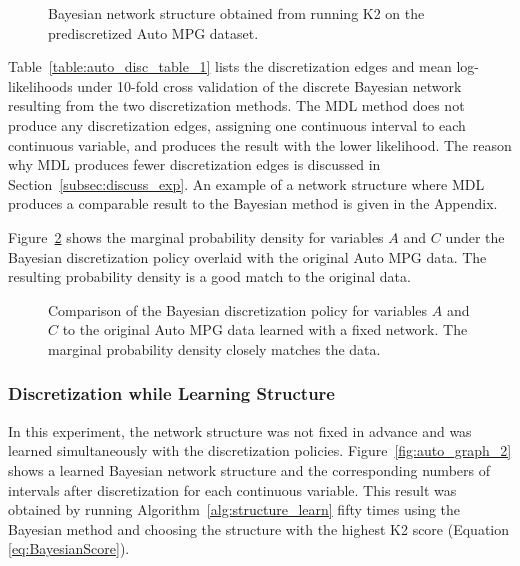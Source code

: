 \begin{figure}[ht]
  \centering
   
   \caption{Bayesian network structure obtained from running K2 on the prediscretized Auto MPG dataset.}
  \label{fig:auto_graph_1}
\end{figure}

Table~\ref{table:auto_disc_table_1} lists the discretization edges and mean log-likelihoods under \num{10}-fold cross validation of the discrete Bayesian network resulting from the two discretization methods.
The MDL method does not produce any discretization edges, assigning one continuous interval to each continuous variable, and produces the result with the lower likelihood.
The reason why MDL produces fewer discretization edges is discussed in Section~\ref{subsec:discuss_exp}.
An example of a network structure where MDL produces a comparable result to the Bayesian method is given in the Appendix.

\begin{table}[ht]
  \centering
  \caption{
    Discretization result of the Auto MPG dataset with fixed structure from Figure~\ref{fig:auto_graph_1}.
    The first five rows list the discretization edges and the last row lists the mean cross-validated log-likelihood; positive values are better.
  }
  
  \label{table:auto_disc_table_1}
\end{table}

Figure~\ref{fig:auto_exp1_distr_1_3} shows the marginal probability density for variables $A$ and $C$ under the Bayesian discretization policy overlaid with the original Auto MPG data.
The resulting probability density is a good match to the original data.

\begin{figure}[ht]
  \centering
  
  \caption{
    Comparison of the Bayesian discretization policy for variables $A$ and $C$ to the original Auto MPG data learned with a fixed network.
    The marginal probability density closely matches the data.
  }
  \label{fig:auto_exp1_distr_1_3}
\end{figure}

\subsubsection{Discretization while Learning Structure}
\label{subsubsec:auto_exp2}

In this experiment, the network structure was not fixed in advance and was learned simultaneously with the discretization policies.
Figure~\ref{fig:auto_graph_2} shows a learned Bayesian network structure and the corresponding numbers of intervals after discretization for each continuous variable.
This result was obtained by running Algorithm~\ref{alg:structure_learn} fifty times using the Bayesian method and choosing the structure with the highest K2 score (Equation \ref{eq:BayesianScore}).

